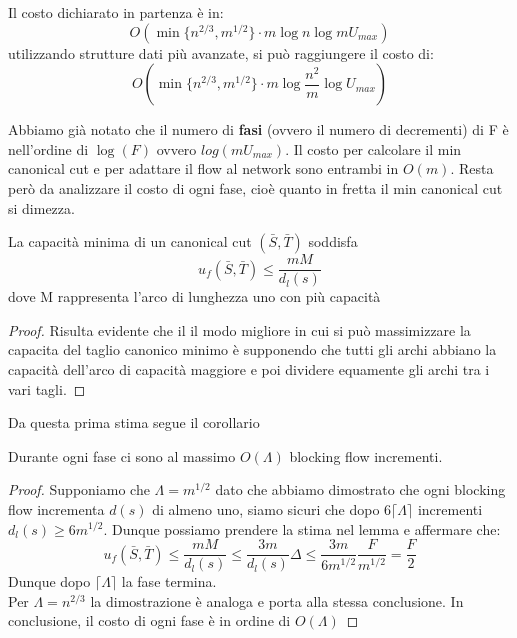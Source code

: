         Il costo dichiarato in partenza è in:
        \[O(\min \{n^{2/3}, m^{1/2}\}\cdot m \log n\log m U_{max})\]
        utilizzando strutture dati più avanzate, si può raggiungere il costo di:
        \[O(\min \{n^{2/3}, m^{1/2}\}\cdot m \log \frac{n^2}{m}\log U_{max})\]


    Abbiamo già notato che il numero di \textbf{fasi} (ovvero il numero di decrementi) di F è nell'ordine di $\log(F)$ ovvero $log(m U_{max})$.
    Il costo per calcolare il min canonical cut e per adattare il flow al network sono entrambi in $O(m)$.
    Resta però da analizzare il costo di ogni fase, cioè quanto in fretta il min canonical cut si dimezza.
    \begin{lemma}
        {}{}
        La capacità minima di un canonical cut $(\bar{S}, \bar{T})$ soddisfa
        \[u_f(\bar{S}, \bar{T})\le \frac{mM}{d_l(s)}\]
        dove M rappresenta l'arco di lunghezza uno con più capacità
    \end{lemma}
    \begin{proof}
        Risulta evidente che il il modo migliore in cui si può massimizzare la capacita del taglio canonico minimo è supponendo che tutti gli archi abbiano la capacità dell'arco di capacità maggiore e poi dividere equamente gli archi tra i vari tagli.

    \end{proof}

    Da questa prima stima segue il corollario
    \begin{corollary}{}{}
    Durante ogni fase ci sono al massimo $O(\Lambda)$ blocking flow incrementi.
    \end{corollary}
    \begin{proof}
        Supponiamo che $\Lambda = m^{1/2}$ dato che abbiamo dimostrato che ogni blocking flow incrementa $d(s)$ di almeno uno, siamo sicuri che dopo $6\lceil \Lambda\rceil$ incrementi $d_l(s) \ge 6 m^{1/2}$.
        Dunque possiamo prendere la stima nel lemma e affermare che:
        \[ u_f(\bar{S}, \bar{T})\le \frac{mM}{d_l(s)}\le \frac{3m}{d_l(s)}\Delta\le \frac{3m}{6m^{1/2}}\frac{F}{m^{1/2}} = \frac{F}{2}\]
        Dunque dopo $\lceil \Lambda\rceil$ la fase termina.\\
        Per $\Lambda = n^{2/3}$ la dimostrazione è analoga e porta alla stessa conclusione. 
        In conclusione, il costo di ogni fase è in ordine di $O(\Lambda)$ 
    \end{proof}
    
